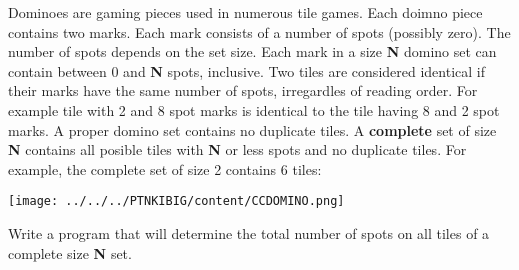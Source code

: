 Dominoes are gaming pieces used in numerous tile games. Each doimno piece contains two marks. Each mark consists of a number of spots (possibly zero). The number of spots depends on the set size. Each mark in a size \textbf{N} domino set can contain between 0 and \textbf{N} spots, inclusive. Two tiles are considered identical if their marks have the same number of spots, irregardles of reading order. For example tile with 2 and 8 spot marks is identical to the tile having 8 and 2 spot marks. A proper domino set contains no duplicate tiles. A \textbf{complete }set of size\textbf{ N} contains all posible tiles with \textbf{N} or less spots and no duplicate tiles. For example, the complete set of size 2 contains 6 tiles:


\texttt{[image: ../../../PTNKIBIG/content/CCDOMINO.png]}

Write a program that will determine the total number of spots on all tiles of a complete size \textbf{N} set.